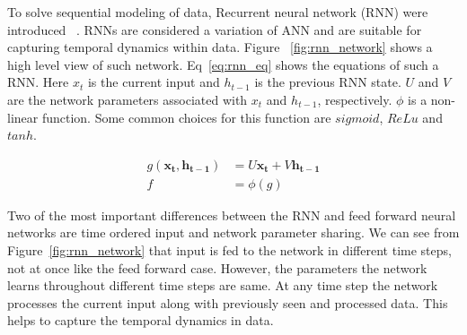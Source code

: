 \documentclass[10pt,twocolumn,letterpaper]{article}
\begin{document}

To solve sequential modeling of data, Recurrent neural network (RNN) were 
introduced ~\cite{DBLP:journals/corr/Lipton15}. RNNs are considered a  variation of ANN and are 
suitable for capturing temporal dynamics within 
data. Figure ~\ref{fig:rnn_network} shows a high level view of such network. 
Eq~\ref{eq:rnn_eq} shows the equations of such a  RNN. Here $x_t$ is the current input and $h_{t-1}$ is the previous RNN state. $U$ and $V$ are the network parameters associated with $x_t$ and $h_{t-1}$,
respectively. $\phi$ is a non-linear function. Some common choices for this function are $sigmoid$, $ReLu$ and $tanh$. 

\begin{equation}
\label{eq:rnn_eq}
\begin{aligned}
g(\mathbf{x_t}, \mathbf{h_{t-1}}) & = U\mathbf{x_t} + V\mathbf{h_{t-1}} \\ f & = \phi(g)
\end{aligned}
\end{equation} 

Two of the most important differences between the 
RNN and feed forward neural networks are time ordered input and network parameter sharing. We can see 
from Figure~\ref{fig:rnn_network} that input is fed to the network in different time steps, not at once like 
the feed forward case. However,
the parameters the network learns throughout different time steps are same. At any time step the network processes the 
current input along with 
previously seen and processed data. This helps to capture the temporal dynamics in data. 
\end{document}
